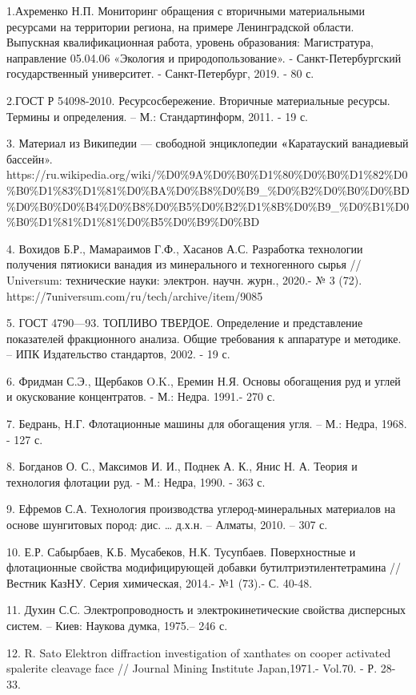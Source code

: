 1.Ахременко Н.П. Мониторинг обращения с вторичными материальными
ресурсами на территории региона, на примере Ленинградской области.
Выпускная квалификационная работа, уровень образования: Магистратура,
направление 05.04.06 «Экология и природопользование». -
Санкт-Петербургский государственный университет. - Санкт-Петербург,
2019. - 80 с.

2.ГОСТ Р 54098-2010. Ресурсосбережение. Вторичные материальные ресурсы.
Термины и определения. -- М.: Стандартинформ, 2011. - 19 с.

3. Материал из Википедии --- свободной энциклопедии
{\bfseries «}Каратауский ванадиевый бассейн».
https://ru.wikipedia.org/wiki/\%D0\%9A\%D0\%B0\%D1\%80\%D0\%B0\%D1\%82\%D0\%B0\%D1\%83\%D1\%81\%D0\%BA\%D0\%B8\%D0\%B9\_\%D0\%B2\%D0\%B0\%D0\%BD\%D0\%B0\%D0\%B4\%D0\%B8\%D0\%B5\%D0\%B2\%D1\%8B\%D0\%B9\_\%D0\%B1\%D0\%B0\%D1\%81\%D1\%81\%D0\%B5\%D0\%B9\%D0\%BD

4. Вохидов Б.Р., Мамараимов Г.Ф., Хасанов А.С. Разработка технологии
получения пятиокиси ванадия из минерального и техногенного сырья //
Universum: технические науки: электрон. научн. журн., 2020.- № 3 (72).
https://7universum.com/ru/tech/archive/item/9085

5. ГОСТ 4790---93. ТОПЛИВО ТВЕРДОЕ. Определение и представление
показателей фракционного анализа. Общие требования к аппаратуре и
методике. -- ИПК Издательство стандартов, 2002. - 19 с.

6. Фридман С.Э., Щербаков O.K., Еремин Н.Я. Основы обогащения руд и
углей и окускование концентратов. - М.: Недра. 1991.- 270 с.

7. Бедрань, Н.Г. Флотационные машины для обогащения угля. -- М.: Недра,
1968. - 127 с.

8. Богданов О. С., Максимов И. И., Поднек А. К., Янис Н. А. Теория и
технология флотации руд. - М.: Недра, 1990. - 363 с.

9. Ефремов С.А. Технология производства углерод-минеральных материалов
на основе шунгитовых пород: дис. \ldots{} д.х.н. -- Алматы, 2010. -- 307
с.

10. Е.Р. Сабырбаев, К.Б. Мусабеков, Н.К. Тусупбаев. Поверхностные и
флотационные свойства модифицирующей добавки бутилтриэтилентетрамина //
Вестник КазНУ. Серия химическая, 2014.- №1 (73).- С. 40-48.

11. Духин С.С. Электропроводность и электрокинетические свойства
дисперсных систем. -- Киев: Наукова думка, 1975.-- 246 с.

12. R. Sato Elektron diffraction investigation of xanthates on cooper
activated spalerite cleavage face // Journal Mining Institute
Japan,1971.- Vol.70. - Р. 28-33.

